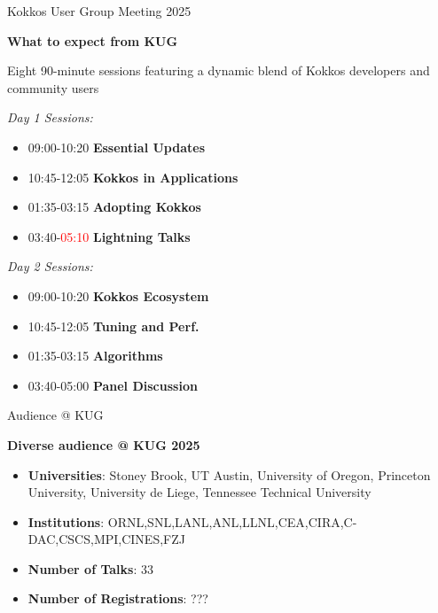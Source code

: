
\begin{frame}[fragile]{Kokkos User Group Meeting 2025}
\begin{center}
\textbf{What to expect from KUG}
\end{center}

\begin{center}
  Eight 90-minute sessions featuring a dynamic blend of Kokkos developers and community users
\end{center}

  \begin{multicols}{2}
    \textit{Day 1 Sessions:}
      \begin{itemize}
        \item{09:00-10:20 \textbf{Essential Updates}}
        \item{10:45-12:05 \textbf{Kokkos in Applications}}
        \item{01:35-03:15 \textbf{Adopting Kokkos}}
        \item{03:40-\textcolor{red}{05:10} \textbf{Lightning Talks}}
    \end{itemize}

    \columnbreak

    \textit{Day 2 Sessions:}
      \begin{itemize}
        \item{09:00-10:20 \textbf{Kokkos Ecosystem}}
        \item{10:45-12:05 \textbf{Tuning and Perf.}}
        \item{01:35-03:15 \textbf{Algorithms}}
        \item{03:40-05:00 \textbf{Panel Discussion}}
    \end{itemize}
  \end{multicols}
\end{frame}

\begin{frame}[fragile]{Audience @ KUG}
\begin{center}
\textbf{Diverse audience @ KUG 2025}
\vspace{0.5cm}

  \begin{itemize}
    \item{\textbf{Universities}: Stoney Brook, UT Austin, University of Oregon, Princeton University, University de Liege, Tennessee Technical University}
    \item{\textbf{Institutions}: ORNL,SNL,LANL,ANL,LLNL,CEA,CIRA,C-DAC,CSCS,MPI,CINES,FZJ}
    \item{\textbf{Number of Talks}: 33}
    \item{\textbf{Number of Registrations}: ???}
  \end{itemize}

\end{center}
\end{frame}

